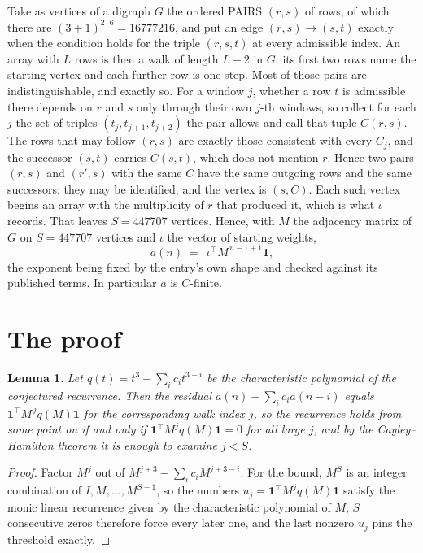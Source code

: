 \documentclass[11pt,a4paper]{article}
\theoremstyle{plain}
\newtheorem{lemma}[theorem]{Lemma}
\theoremstyle{definition}
\begin{document}
Take as vertices of a digraph $G$ the ordered PAIRS $(r,s)$ of rows, of which there are
$(3+1)^{2\cdot6}=16777216$, and put an edge $(r,s)\to(s,t)$ exactly when the condition
holds for the triple $(r,s,t)$ at every admissible index. An array with $L$ rows is then a
walk of length $L-2$ in $G$: its first two rows name the starting vertex and each further
row is one step. Most of those pairs are indistinguishable, and exactly so. For a window $j$, whether a row $t$ is admissible there depends on $r$ and $s$ only through their own $j$-th windows, so collect for each $j$ the set of triples $(t_j,t_{j+1},t_{j+2})$ the pair allows and call that tuple $C(r,s)$. The rows that may follow $(r,s)$ are exactly those consistent with every $C_j$, and the successor $(s,t)$ carries $C(s,t)$, which does not mention $r$. Hence two pairs $(r,s)$ and $(r',s)$ with the same $C$ have the same outgoing rows and the same successors: they may be identified, and the vertex is $(s,C)$. Each such vertex begins an array with the multiplicity of $r$ that produced it, which is what $\iota$ records. That leaves $S=447707$ vertices. Hence, with $M$ the adjacency matrix of $G$ on $S=447707$ vertices and
$\iota$ the vector of starting weights,
\[
a(n)\;=\;\,\iota^{\!\top}M^{\,n-1+1}\mathbf{1},
\]
the exponent being fixed by the entry's own shape and checked against its published terms.
In particular $a$ is $C$-finite.

\section{The proof}

\begin{lemma}\label{lem:crit}
Let $q(t)=t^{3}-\sum_i c_it^{3-i}$ be the characteristic polynomial of the
conjectured recurrence. Then the residual $a(n)-\sum_ic_ia(n-i)$ equals
$\mathbf{1}^{\!\top}M^{\,j}q(M)\mathbf{1}$ for the corresponding walk index
$j$, so the recurrence holds from some point on if and only if
$\mathbf{1}^{\!\top}M^{j}q(M)\mathbf{1}=0$ for all large $j$; and by the
Cayley--Hamilton theorem it is enough to examine $j<S$.
\end{lemma}

\begin{proof}
Factor $M^{j}$ out of $M^{j+3}-\sum_ic_iM^{j+3-i}$. For the bound, $M^{S}$
is an integer combination of $I,M,\dots,M^{S-1}$, so the numbers
$u_j=\mathbf{1}^{\!\top}M^{j}q(M)\mathbf{1}$ satisfy the monic linear recurrence given by
the characteristic polynomial of $M$; $S$ consecutive zeros therefore force every later one,
and the last nonzero $u_j$ pins the threshold exactly.
\end{proof}
\end{document}
